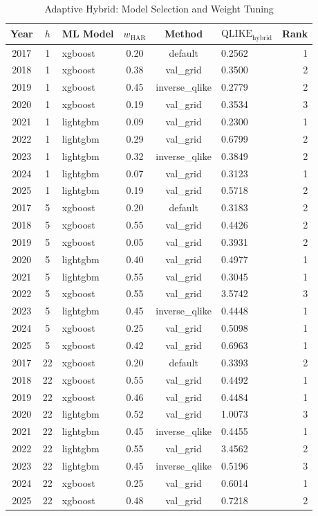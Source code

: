 \begin{table}[htbp]
\centering
\caption{Adaptive Hybrid: Model Selection and Weight Tuning}
\label{tab:adaptive_details}
\begin{tabular}{cclcclr}
\toprule
Year & $h$ & ML Model & $w_{\text{HAR}}$ & Method & $\text{QLIKE}_{\text{hybrid}}$ & Rank \\
\midrule
2017 & 1 & xgboost & 0.20 & default & 0.2562 & 1 \\
2018 & 1 & xgboost & 0.38 & val\_grid & 0.3500 & 2 \\
2019 & 1 & xgboost & 0.45 & inverse\_qlike & 0.2779 & 2 \\
2020 & 1 & xgboost & 0.19 & val\_grid & 0.3534 & 3 \\
2021 & 1 & lightgbm & 0.09 & val\_grid & 0.2300 & 1 \\
2022 & 1 & lightgbm & 0.29 & val\_grid & 0.6799 & 2 \\
2023 & 1 & lightgbm & 0.32 & inverse\_qlike & 0.3849 & 2 \\
2024 & 1 & lightgbm & 0.07 & val\_grid & 0.3123 & 1 \\
2025 & 1 & lightgbm & 0.19 & val\_grid & 0.5718 & 2 \\
2017 & 5 & xgboost & 0.20 & default & 0.3183 & 2 \\
2018 & 5 & xgboost & 0.55 & val\_grid & 0.4426 & 2 \\
2019 & 5 & xgboost & 0.05 & val\_grid & 0.3931 & 2 \\
2020 & 5 & lightgbm & 0.40 & val\_grid & 0.4977 & 1 \\
2021 & 5 & lightgbm & 0.55 & val\_grid & 0.3045 & 1 \\
2022 & 5 & xgboost & 0.55 & val\_grid & 3.5742 & 3 \\
2023 & 5 & lightgbm & 0.45 & inverse\_qlike & 0.4448 & 1 \\
2024 & 5 & xgboost & 0.25 & val\_grid & 0.5098 & 1 \\
2025 & 5 & xgboost & 0.42 & val\_grid & 0.6963 & 1 \\
2017 & 22 & xgboost & 0.20 & default & 0.3393 & 2 \\
2018 & 22 & xgboost & 0.55 & val\_grid & 0.4492 & 1 \\
2019 & 22 & xgboost & 0.46 & val\_grid & 0.4484 & 1 \\
2020 & 22 & lightgbm & 0.52 & val\_grid & 1.0073 & 3 \\
2021 & 22 & lightgbm & 0.45 & inverse\_qlike & 0.4455 & 1 \\
2022 & 22 & lightgbm & 0.55 & val\_grid & 3.4562 & 2 \\
2023 & 22 & lightgbm & 0.45 & inverse\_qlike & 0.5196 & 3 \\
2024 & 22 & xgboost & 0.25 & val\_grid & 0.6014 & 1 \\
2025 & 22 & xgboost & 0.48 & val\_grid & 0.7218 & 2 \\
\bottomrule
\end{tabular}
\end{table}